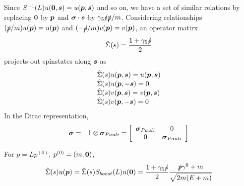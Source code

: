 Since $S^{-1}(L) u(\mbox{\boldmath $0$},\mbox{\boldmath $s$}) = u(\mbox{\boldmath $p$},\mbox{\boldmath $s$})$ and so on, we have
a set of similar relations by replacing $\mbox{\boldmath $0$}$ by $\mbox{\boldmath $p$}$ and
$\mbox{\boldmath $\sigma$}\cdot \mbox{\boldmath $s$}$ by $\gamma_5 \slashed{s} \slashed{p} / m$.
Considering relationships $(\slashed{p}/m)u(\mbox{\boldmath $p$}) = u(\mbox{\boldmath $p$})$
and $(-\slashed{p}/m)v(\mbox{\boldmath $p$}) = v(\mbox{\boldmath $p$})$, an operator matirx
\begin{eqnarray}
\hat{\Sigma}(s)
 = 
\frac{1 + \gamma_5 \slashed{s}}{2}
 \end{eqnarray}
projects out 
spinstates along $\mbox{\boldmath $s$}$ as
\begin{eqnarray}
\begin{array}{l}
\hat{\Sigma}(s) u(\mbox{\boldmath $p$}, \mbox{\boldmath $s$}) = u(\mbox{\boldmath $p$}, \mbox{\boldmath $s$})
\\
\hat{\Sigma}(s) u(\mbox{\boldmath $p$}, -\mbox{\boldmath $s$}) = 0
\\
\hat{\Sigma}(s) v(\mbox{\boldmath $p$}, \mbox{\boldmath $s$}) = v(\mbox{\boldmath $p$}, \mbox{\boldmath $s$})
\\
\hat{\Sigma}(s) v(\mbox{\boldmath $p$}, -\mbox{\boldmath $s$}) = 0
\end{array}
\end{eqnarray}
In the Dirac representation,
\begin{eqnarray}
\mbox{\boldmath $\sigma$}
&=&
1 \otimes \mbox{\boldmath $\sigma$}_{Pauli}
=
\left[
\begin{array}{cc}
\mbox{\boldmath $\sigma$}_{Pauli} & 0 \\
0 & \mbox{\boldmath $\sigma$}_{Pauli}
\end{array}
\right]
\end{eqnarray}


\bigskip

For $p = Lp^{(0)}$, $p^{(0)} = (m, \mbox{\boldmath $0$})$,
\begin{eqnarray}
\hat{\Sigma}(s) u(\mbox{\boldmath $p$})
=
\hat{\Sigma}(s)
S_{boost}(L)
u(\mbox{\boldmath $0$})
=
\frac{1 + \gamma_5 \slashed{s}}{2}
\frac{\slashed{p}\gamma^0 + m}{\sqrt{2m(E+m)}}
\end{eqnarray}

\begin{comment}
We choose their normalization
\footnote{%
Izykson: $\{ b(\bld{p}),b^\dagger(\bld{p}') \}_+ = \frac{2E}{2m}\delta^3(\bld{p}-\bld{p}')$,
$\bar{u}^r u^s = \delta^{rs}$,\\
\hspace{20mm}$\psi(x) \sim \int d^3\bld{p}\frac{2m}{2E}[ b u e^{-ipx} \dots]$\\
Hioki, Tong: $\{ b(\bld{p}),b^\dagger(\bld{p}') \}_+ = (2\pi)^3 2E\delta^3(\bld{p}-\bld{p}')$,
$\bar{u}^r u^s = 2m \delta^{rs}$,\\
\hspace{20mm}$\psi(x) = \int \frac{d^3\bld{p}}{(2\pi)^32E}[ b u e^{-ipx} \dots]$\\
dim $\psi = E^{3/2}$
}%

\end{comment}


